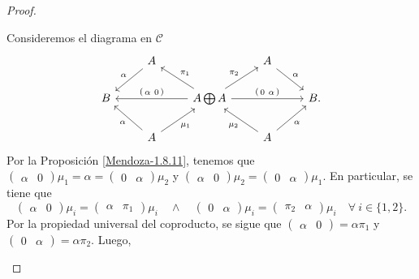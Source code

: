 \documentclass[tesis]{subfiles}
\begin{document}
\begin{proof}
\begin{itemize}
            Consideremos el diagrama en $\mathscr{C}$
            \begin{equation}\label{1.6.13-1}
                \begin{tikzcd}
                    &A\arrow[]{dl}[swap]{\alpha} &&A \arrow[]{dr}[]{\alpha} \\
                    B &&A\bigoplus A \arrow[]{ur}[]{\pi_2}  \arrow[]{rr}[]{(\begin{smallmatrix} 0 \ \alpha \end{smallmatrix})} \arrow[]{ul}[swap]{\pi_1} \arrow[]{ll}[swap]{(\begin{smallmatrix} \alpha \ 0 \end{smallmatrix})} &&B. \\
                      &A \arrow[]{ul}[]{\alpha} \arrow[]{ur}[swap]{\mu_1} &&A \arrow[]{ul}[]{\mu_2}\arrow[]{ur}[swap]{\alpha}
                \end{tikzcd}
            \end{equation}
            Por la Proposición \ref{Mendoza-1.8.11}, tenemos que $(\begin{smallmatrix} \alpha &0 \end{smallmatrix})\mu_1=\alpha=(\begin{smallmatrix} 0 &\alpha \end{smallmatrix})\mu_2$ y $(\begin{smallmatrix} \alpha &0 \end{smallmatrix})\mu_2=(\begin{smallmatrix} 0 &\alpha \end{smallmatrix})\mu_1$. En particular, se tiene que
            \[
                (\begin{smallmatrix} \alpha &0 \end{smallmatrix})\mu_i = (\begin{smallmatrix} \alpha &\pi_1 \end{smallmatrix})\mu_i \quad \land \quad (\begin{smallmatrix} 0 &\alpha \end{smallmatrix})\mu_i = (\begin{smallmatrix} \pi_2 &\alpha \end{smallmatrix})\mu_i \quad \forall \ i\in \{1,2\}.
            \] 
            Por la propiedad universal del coproducto, se sigue que $(\begin{smallmatrix} \alpha &0 \end{smallmatrix}) = \alpha\pi_1$ y $(\begin{smallmatrix} 0 &\alpha \end{smallmatrix}) = \alpha\pi_2$. Luego,

\end{itemize}
\end{proof}
\end{document}
